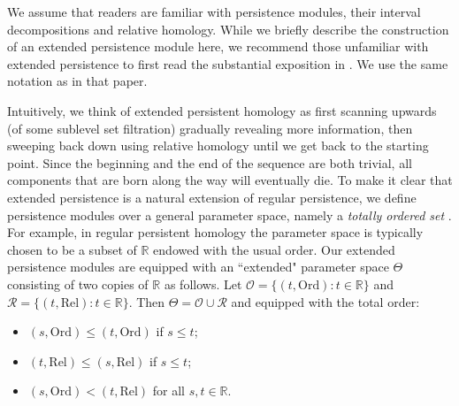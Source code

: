 \documentclass[a4paper,11pt]{article}
\theoremstyle{definition}
\newcommand{\R}{\mathbb{R}}
\begin{document}
We assume that readers are familiar with persistence modules, their interval decompositions and relative homology. 
While we briefly describe the construction of an extended persistence module here, we recommend those unfamiliar with extended persistence to first read the substantial exposition in \cite{KT2022}. We use the same notation as in that paper.  

Intuitively, we think of extended persistent homology as first scanning upwards (of some sublevel set filtration) gradually revealing more information, then sweeping back down using relative homology until we get back to the starting point.  Since the beginning and the end of the sequence are both trivial, all components that are born along the way will eventually die. 
To make it clear that extended persistence is a natural extension of regular persistence, we define persistence modules over a general parameter space, namely a \emph{totally ordered set} \cite{KT2022}. 
For example, in regular persistent homology the parameter space is typically chosen to be a subset of $\R$ endowed with the usual order.  
Our extended persistence modules are equipped with an ``extended" parameter space $\Theta$ consisting of two copies of $\R$ as follows. Let $\mathcal{O} = \{(t,\text{Ord}): t\in\R\}$ and $\mathcal{R}=\{(t,\text{Rel}): t\in\R\}$. Then $\Theta=\mathcal{O}\cup \mathcal{R}$ and equipped with the total order:
\begin{itemize}
    \item $(s,\text{Ord}) \leq (t,\text{Ord})$ if $s\leq t$;
    \item $(t,\text{Rel}) \leq (s,\text{Rel})$ if $s\leq t$;
    \item $(s,\text{Ord})<(t,\text{Rel})$ for all $s,t\in\R$.
\end{itemize}
\end{document}
